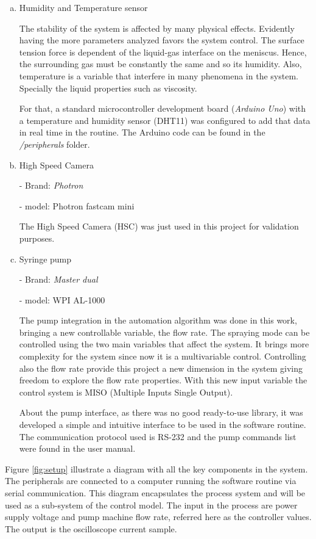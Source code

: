 \begin{enumerate}[a)]
  \item Humidity and Temperature sensor
  
  The stability of the system is affected by many physical effects. Evidently having the more parameters analyzed favors the system control.
  The surface tension force is dependent of the liquid-gas interface on the meniscus. Hence, the surrounding gas must be constantly the same and so its humidity.
  Also, temperature is a variable that interfere in many phenomena in the system. Specially the liquid properties such as viscosity.

  For that, a standard microcontroller development board (\emph{Arduino Uno}) with a temperature and humidity sensor (DHT11) was configured to add that data in real time in the routine.
  The Arduino code can be found in the \emph{/peripherals} folder.
  

  \item High Speed Camera 
  
  - Brand: \emph{Photron}

  - model: Photron fastcam mini

  The High Speed Camera (HSC) was just used in this project for validation purposes.
  
  \item Syringe pump
  
  - Brand: \emph{Master dual}

  - model: WPI AL-1000

  The pump integration in the automation algorithm was done in this work, bringing a new controllable variable, the flow rate. The spraying mode can be controlled using the two main variables that affect the system. 
  It brings more complexity for the system since now it is a multivariable control.
  Controlling also the flow rate provide this project a new dimension in the system giving freedom to explore the flow rate properties.
  With this new input variable the control system is MISO (Multiple Inputs Single Output).

  About the pump interface, as there was no good ready-to-use library, it was developed a simple and intuitive interface to be used in the software routine.
  The communication protocol used is RS-232 and the pump commands list were found in the user manual.


  \end{enumerate}


Figure \ref{fig:setup} illustrate a diagram with all the key components in the system. The peripherals are connected to a computer running the software routine via serial communication. 
This diagram encapsulates the process system and will be used as a sub-system of the control model. The input in the process are power supply voltage and pump machine flow rate, referred here as the controller values. The output is the oscilloscope current sample.


